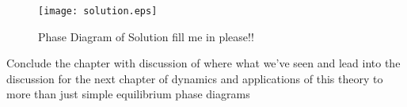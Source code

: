 \begin{figure}
    \centering	
    \texttt{[image: solution.eps]}
	\caption{
        \label{precip} Phase Diagram of Solution \color{ForestGreen} fill
        me in please!!
    }
\end{figure}


{
    \color{ForestGreen} Conclude the chapter with discussion of where what we've
    seen and lead into the discussion for the next chapter of dynamics and
    applications of this theory to more than just simple equilibrium 
    phase diagrams
}
